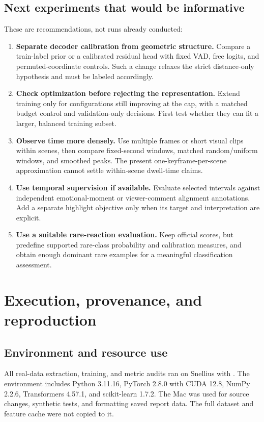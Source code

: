 \documentclass[11pt,a4paper]{article}
\begin{document}
\subsection{Next experiments that would be informative}
These are recommendations, not runs already conducted:
\begin{enumerate}
\item \textbf{Separate decoder calibration from geometric structure.} Compare a train-label prior or a calibrated residual head with fixed VAD, free logits, and permuted-coordinate controls. Such a change relaxes the strict distance-only hypothesis and must be labeled accordingly.
\item \textbf{Check optimization before rejecting the representation.} Extend training only for configurations still improving at the cap, with a matched budget control and validation-only decisions. First test whether they can fit a larger, balanced training subset.
\item \textbf{Observe time more densely.} Use multiple frames or short visual clips within scenes, then compare fixed-second windows, matched random/uniform windows, and smoothed peaks. The present one-keyframe-per-scene approximation cannot settle within-scene dwell-time claims.
\item \textbf{Use temporal supervision if available.} Evaluate selected intervals against independent emotional-moment or viewer-comment alignment annotations. Add a separate highlight objective only when its target and interpretation are explicit.
\item \textbf{Use a suitable rare-reaction evaluation.} Keep official scores, but predefine supported rare-class probability and calibration measures, and obtain enough dominant rare examples for a meaningful classification assessment.
\end{enumerate}

\section{Execution, provenance, and reproduction}
\subsection{Environment and resource use}
All real-data extraction, training, and metric audits ran on Snellius with . The environment includes Python 3.11.16, PyTorch 2.8.0 with CUDA 12.8, NumPy 2.2.6, Transformers 4.57.1, and scikit-learn 1.7.2. The Mac was used for source changes, synthetic tests, and formatting saved report data. The full dataset and feature cache were not copied to it.
\end{document}
